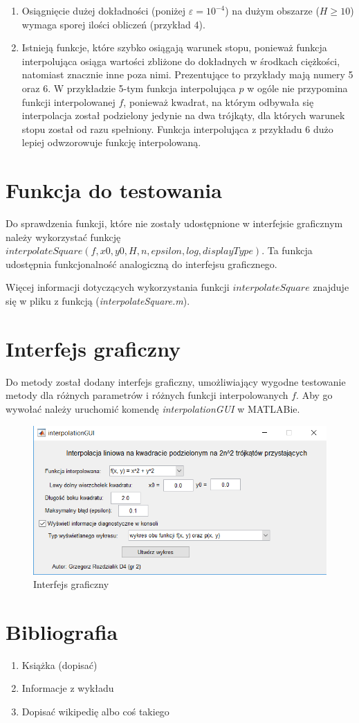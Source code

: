 \documentclass[12pt]{article}
\begin{document}
\begin{enumerate}
		\item Osiągnięcie dużej dokładności (poniżej $\varepsilon = 10^{-4}$) na dużym obszarze ($H \geq 10$) wymaga sporej ilości obliczeń (przykład 4).
		
		\item Istnieją funkcje, które szybko osiągają warunek stopu, ponieważ funkcja interpolująca osiąga wartości zbliżone do dokładnych w środkach ciężkości, natomiast znacznie inne poza nimi. Prezentujące to przykłady mają numery 5 oraz 6. W przykładzie 5-tym funkcja interpolująca $p$ w ogóle nie przypomina funkcji interpolowanej $f$, ponieważ kwadrat, na którym odbywała się interpolacja został podzielony jedynie na dwa trójkąty, dla których warunek stopu został od razu spełniony. Funkcja interpolująca z przykładu 6 dużo lepiej odwzorowuje funkcję interpolowaną.
	\end{enumerate}

	\pagebreak
	
	\section{Funkcja do testowania}
	Do sprawdzenia funkcji, które nie zostały udostępnione w interfejsie graficznym należy wykorzystać funkcję $interpolateSquare(f, x0, y0, H, n, epsilon, log, displayType)$. Ta funkcja udostępnia funkcjonalność analogiczną do interfejsu graficznego.
	
	Więcej informacji dotyczących wykorzystania funkcji $interpolateSquare$ znajduje się w pliku z funkcją (\textit{interpolateSquare.m}).
	
	\section{Interfejs graficzny}
	Do metody został dodany interfejs graficzny, umożliwiający wygodne testowanie metody dla różnych parametrów i różnych funkcji interpolowanych $f$. Aby go wywołać należy uruchomić komendę \textit{interpolationGUI} w MATLABie.
	
	\begin{figure}
		\includegraphics[scale=1]{images/gui.png}
		\caption{Interfejs graficzny}
	\end{figure}
	
	\section{Bibliografia}
	\begin{enumerate}
		\item Książka (dopisać)
		\item Informacje z wykładu
		\item Dopisać wikipedię albo coś takiego
	\end{enumerate}
	
\end{document}

